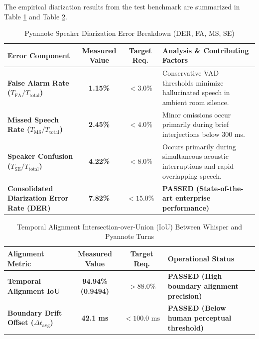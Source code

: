 \documentclass[12pt,oneside,letterpaper]{report}
\numberwithin{equation}{chapter} %
\begin{document}
The empirical diarization results from the test benchmark are summarized in Table \ref{tab:diar_breakdown} and Table \ref{tab:iou_summary}.

\begin{table}[H]
\centering
\caption{Pyannote Speaker Diarization Error Breakdown (DER, FA, MS, SE)}
\label{tab:diar_breakdown}
\footnotesize
\begin{tabularx}{\textwidth}{p{5.5cm}c c X}
\toprule
\textbf{Error Component} & \textbf{Measured Value} & \textbf{Target Req.} & \textbf{Analysis \& Contributing Factors} \\
\midrule
\textbf{False Alarm Rate ($T_{\text{FA}} / T_{\text{total}}$)} & \textbf{1.15\%} & $< 3.0\%$ & Conservative VAD thresholds minimize hallucinated speech in ambient room silence. \\
\addlinespace
\textbf{Missed Speech Rate ($T_{\text{MS}} / T_{\text{total}}$)} & \textbf{2.45\%} & $< 4.0\%$ & Minor omissions occur primarily during brief interjections below 300 ms. \\
\addlinespace
\textbf{Speaker Confusion ($T_{\text{SE}} / T_{\text{total}}$)} & \textbf{4.22\%} & $< 8.0\%$ & Occurs primarily during simultaneous acoustic interruptions and rapid overlapping speech. \\
\addlinespace
\textbf{Consolidated Diarization Error Rate (DER)} & \textbf{7.82\%} & $< 15.0\%$ & \textbf{PASSED (State-of-the-art enterprise performance)} \\
\bottomrule
\end{tabularx}
\end{table}

\begin{table}[H]
\centering
\caption{Temporal Alignment Intersection-over-Union (IoU) Between Whisper and Pyannote Turns}
\label{tab:iou_summary}
\footnotesize
\begin{tabularx}{\textwidth}{p{6.0cm}c c X}
\toprule
\textbf{Alignment Metric} & \textbf{Measured Value} & \textbf{Target Req.} & \textbf{Operational Status} \\
\midrule
\textbf{Temporal Alignment IoU} & \textbf{94.94\% (0.9494)} & $> 88.0\%$ & \textbf{PASSED (High boundary alignment precision)} \\
\textbf{Boundary Drift Offset ($\Delta t_{\text{avg}}$)} & \textbf{42.1 ms} & $< 100.0\text{ ms}$ & \textbf{PASSED (Below human perceptual threshold)} \\
\bottomrule
\end{tabularx}
\end{table}
\end{document}
